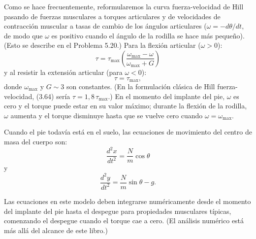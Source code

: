 \documentclass[12pt]{book}
\begin{document}
Como se hace frecuentemente, reformularemos la curva fuerza-velocidad de Hill pasando de fuerzas musculares a torques articulares y de velocidades de contracción muscular a tasas de cambio de los ángulos articulares ($\omega = -d\theta/dt$, de modo que $\omega$ es positivo cuando el ángulo de la rodilla se hace más pequeño). (Esto se describe en el Problema 5.20.) Para la flexión articular ($\omega > 0$):
\begin{equation}
\tau = \tau_{\max} \left( \frac{\omega_{\max} - \omega}{\omega_{\max} + G} \right)
\label{eq:3.63}
\end{equation}
y al resistir la extensión articular (para $\omega < 0$):
\begin{equation}
\tau = \tau_{\max},
\label{eq:3.64}
\end{equation}
donde $\omega_{\max}$ y $G \sim 3$ son constantes. (En la formulación clásica de Hill fuerza-velocidad, (3.64) sería $\tau = 1{,}8\,\tau_{\max}$.) En el momento del implante del pie, $\omega$ es cero y el torque puede estar en su valor máximo; durante la flexión de la rodilla, $\omega$ aumenta y el torque disminuye hasta que se vuelve cero cuando $\omega = \omega_{\max}$.

Cuando el pie todavía está en el suelo, las ecuaciones de movimiento del centro de masa del cuerpo son:
\begin{equation}
\frac{d^2 x}{dt^2} = \frac{N}{m} \cos\theta
\label{eq:3.65}
\end{equation}
y
\begin{equation}
\frac{d^2 y}{dt^2} = \frac{N}{m} \sin\theta - g.
\label{eq:3.66}
\end{equation}

Las ecuaciones en este modelo deben integrarse numéricamente desde el momento del implante del pie hasta el despegue para propiedades musculares típicas, comenzando el despegue cuando el torque cae a cero. (El análisis numérico está más allá del alcance de este libro.)
\end{document}
